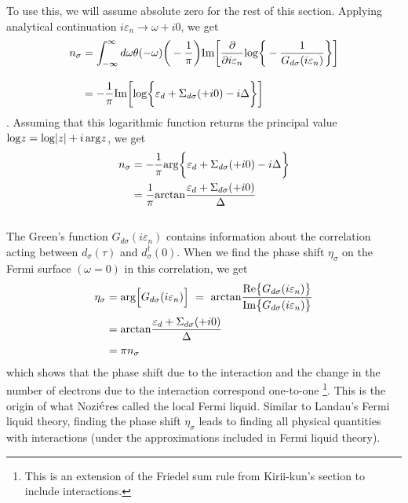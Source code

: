 \documentclass[a4j]{jarticle}
\begin{document}
To use this, we will assume absolute zero for the rest of this section.
Applying analytical continuation $i \varepsilon_{n} \to \omega + i0$, we get
\begin{align}
	n_{\sigma}
	 & =
	\int^{\infty}_{-\infty}
	d \omega
	\theta(-\omega)
	\bigg(- \frac{1}{\pi} \bigg)
	{\rm Im}
	\bigg[
		\frac{\partial}{\partial i \varepsilon_{n}}
		{\rm log}
		\bigg\{
		- \frac{1}{G_{d \sigma}(i \varepsilon_{n})}
		\bigg\}
		\bigg]
	\nonumber \\[3mm] &=
	- \frac{1}{\pi}
	{\rm Im}
	\bigg[
		{\rm log}
		\bigg\{
		\varepsilon_{d}
		+
		\Sigma_{d\sigma}(+i 0)
		-
		i \Delta
		\bigg\}
		\bigg]
\end{align}
.
Assuming that this logarithmic function returns the principal value ${\rm log} z = {\rm log} |z| + i \ \! {\rm arg} z$, we get
\begin{align}
	n_{\sigma}
	 & =
	- \frac{1}{\pi}
	{\rm arg}
	\bigg\{
	\varepsilon_{d}
	+
	\Sigma_{d\sigma}(+i 0)
	-
	i \Delta
	\bigg\}
	\nonumber \\ &=
	\frac{1}{\pi}
	{\rm arctan}
	\frac{\varepsilon_{d}
		+
		\Sigma_{d\sigma}(+i 0)
	}{
		\Delta
	}
\end{align}

${}$

The Green's function $G_{d \sigma}(i \varepsilon_{n})$ contains information about the correlation acting between $d_{\sigma}(\tau)$ and $d^{\dagger}_{\sigma}(0)$.
When we find the phase shift $\eta_{\sigma}$ on the Fermi surface $(\omega=0)$ in this correlation, we get
\begin{align}
	\eta_{\sigma}
	 & =
	{\rm arg}
	\Big[ G_{d \sigma}(i \varepsilon_{n}) \Big]
	\ = \
	{\rm arctan}
	\frac{
		{\rm Re} \big\{ G_{d \sigma}(i \varepsilon_{n}) \big\}
	}{
		{\rm Im} \big\{ G_{d \sigma}(i \varepsilon_{n}) \big\}
	}
	\nonumber \\ &=
	{\rm arctan}
	\frac{
		\varepsilon_{d} + \Sigma_{d \sigma} (+i 0)
	}{
		\Delta
	}
	\nonumber \\ &=
	\pi n_{\sigma}
\end{align}
which shows that the phase shift due to the interaction and the change in the number of electrons due to the interaction correspond one-to-one
\footnote{
	This is an extension of the Friedel sum rule from Kirii-kun's section to include interactions.
}.
This is the origin of what Nozi$\acute{\rm e}$res called the local Fermi liquid.
Similar to Landau's Fermi liquid theory, finding the phase shift $\eta_{\sigma}$ leads to finding all physical quantities with interactions (under the approximations included in Fermi liquid theory).
\end{document}
